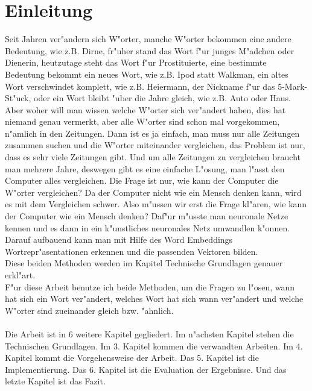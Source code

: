\chapter{Einleitung}

Seit Jahren ver"andern sich W"orter, manche W"orter bekommen eine andere Bedeutung, wie z.B. Dirne, fr"uher stand das Wort f"ur junges M"adchen oder Dienerin, heutzutage steht das Wort f"ur Prostituierte, eine bestimmte Bedeutung bekommt ein neues Wort, wie z.B. Ipod statt Walkman, ein altes Wort verschwindet komplett, wie z.B. Heiermann, der Nickname f"ur das 5-Mark-St"uck, oder ein Wort bleibt "uber die Jahre gleich, wie z.B. Auto oder Haus. Aber woher will man wissen welche W"orter sich ver"andert haben, dies hat niemand genau vermerkt, aber alle W"orter sind schon mal vorgekommen, n"amlich in den Zeitungen. Dann ist es ja einfach,  man muss nur alle Zeitungen zusammen suchen und die W"orter miteinander vergleichen, das Problem ist nur, dass es sehr viele Zeitungen gibt. Und um alle Zeitungen zu vergleichen braucht man mehrere Jahre, deswegen gibt es eine einfache L"osung, man l"asst den Computer alles vergleichen. Die Frage ist nur, wie kann der Computer die W"orter vergleichen? Da der Computer nicht wie ein Mensch denken kann, wird es mit dem Vergleichen schwer. Also m"ussen wir erst die Frage kl"aren, wie kann der Computer wie ein Mensch denken?
Daf"ur m"usste man neuronale Netze kennen und es dann in ein k"unstliches neuronales Netz umwandlen k"onnen.  Darauf aufbauend kann man mit Hilfe des Word Embeddings Wortrepr"asentationen erkennen und die passenden Vektoren bilden.\\
Diese beiden Methoden werden im Kapitel Technische Grundlagen genauer erkl"art.\\
F"ur diese Arbeit benutze ich beide Methoden, um die Fragen zu l"osen, wann hat sich ein Wort ver"andert, welches Wort hat sich wann ver"andert und welche W"orter sind zueinander gleich bzw. "ahnlich.\\\\

Die Arbeit ist in 6 weitere Kapitel gegliedert.
Im n"achsten Kapitel stehen die Technischen Grundlagen. Im 3. Kapitel kommen die verwandten Arbeiten. Im 4. Kapitel kommt die Vorgehensweise der Arbeit. Das 5. Kapitel ist die Implementierung. Das 6. Kapitel ist die Evaluation der Ergebnisse. Und das letzte Kapitel ist das Fazit.





